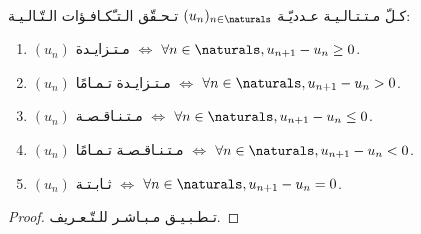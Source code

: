 \begin{theorem}%
    \label{thm:sequences:variations}\ \\%
    كـلّ مـتـتـالـيـة عـدديّـة \((u_n)_{n \in \naturals}\) تـحـقّق الـتـّكـافـؤات الـتّـالـيـة:
    \begin{enumerate}
        \item \((u_n)\) مـتـزايـدة  \(\iff\) \(\forall n \in \naturals, u_{n+1} - u_n \ge 0 \).
        \item \((u_n)\) مـتـزايـدة تـمـامًا \(\iff\) \(\forall n \in \naturals, u_{n+1} - u_n > 0 \).
        \item \((u_n)\) مـتـنـاقـصـة \(\iff\) \(\forall n \in \naturals, u_{n+1} - u_n \le 0 \).
        \item \((u_n)\) مـتـنـاقـصـة تـمـامًا \(\iff\) \(\forall n \in \naturals, u_{n+1} - u_n < 0 \).
        \item \((u_n)\) ثـابـتـة \(\iff\) \(\forall n \in \naturals, u_{n+1} - u_n = 0 \).
    \end{enumerate}
\end{theorem}
\begin{proof}%
    تـطـبـيـق مـبـاشـر للـتّـعـريف.
\end{proof}